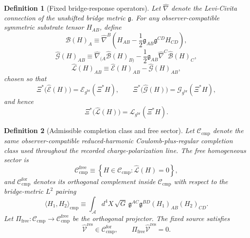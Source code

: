 \documentclass[11pt]{article}
\newcommand{\Sub}{\mathcal A}
\newcommand{\ObserverMap}{\Xi}
\newcommand{\BridgeMetric}{\mathfrak g}
\newcommand{\ObserverMetric}{g^{\mathrm{br}}}
\newcommand{\ResidualLift}{\widehat{\mathcal V}^{\mathrm{res}}}
\newcommand{\SubEinLin}{\widehat{\mathcal E}}
\newcommand{\SubGaugeVec}{\widehat{\mathcal B}}
\newcommand{\SubGaugeBook}{\widehat{\mathcal G}}
\newcommand{\SubReducedEin}{\widehat{\mathcal L}}
\newcommand{\FreeProj}{\Pi_{\mathrm{free}}}
\newcommand{\ReducedEin}{\mathcal L_{\ObserverMetric}}
\newcommand{\GaugeBook}{\mathcal G_{\ObserverMetric}}
\newcommand{\EinLin}{\mathcal E_{\ObserverMetric}}
\newcommand{\CompClass}{\mathscr C_{\mathrm{cmp}}}
\newcommand{\CompFree}{\mathscr C_{\mathrm{cmp}}^{\mathrm{free}}}
\newcommand{\CompForced}{\mathscr C_{\mathrm{cmp}}^{\mathrm{for}}}
\newtheorem{definition}{Definition}
\begin{document}
\begin{definition}[Fixed bridge-response operators]
\label{def:operators}
Let \(\widehat\nabla\) denote the Levi-Civita connection of the unshifted bridge metric \(\BridgeMetric\). For any observer-compatible symmetric substrate tensor \(H_{AB}\), define
\begin{equation}
\SubGaugeVec(H)_A
\equiv
\widehat\nabla^B\!\left(
H_{AB}
-\frac12 \BridgeMetric_{AB}\BridgeMetric^{CD}H_{CD}
\right),
\label{eq:subB}
\end{equation}
\begin{equation}
\SubGaugeBook(H)_{AB}
\equiv
\widehat\nabla_{(A}\SubGaugeVec(H)_{B)}
-\frac12 \BridgeMetric_{AB}\widehat\nabla^C\SubGaugeVec(H)_C,
\label{eq:subG}
\end{equation}
\begin{equation}
\SubReducedEin(H)_{AB}
\equiv
\SubEinLin(H)_{AB}-\SubGaugeBook(H)_{AB},
\label{eq:subL}
\end{equation}
chosen so that
\begin{equation}
\ObserverMap^*\bigl(\SubEinLin(H)\bigr)=\EinLin(\ObserverMap^*H),
\qquad
\ObserverMap^*\bigl(\SubGaugeBook(H)\bigr)=\GaugeBook(\ObserverMap^*H),
\label{eq:intertwine1}
\end{equation}
and hence
\begin{equation}
\ObserverMap^*\bigl(\SubReducedEin(H)\bigr)
=
\ReducedEin(\ObserverMap^*H).
\label{eq:intertwine2}
\end{equation}
\end{definition}

\begin{definition}[Admissible completion class and free sector]
\label{def:class}
Let \(\CompClass\) denote the same observer-compatible reduced-harmonic Coulomb-plus-regular completion class used throughout the recorded charge-polarization line. The free homogeneous sector is
\begin{equation}
\CompFree
\equiv
\left\{
H\in\CompClass:\SubReducedEin(H)=0
\right\},
\label{eq:freeclass}
\end{equation}
and \(\CompForced\) denotes its orthogonal complement inside \(\CompClass\) with respect to the bridge-metric \(L^2\) pairing
\begin{equation}
\langle H_1,H_2\rangle_{\mathrm{cmp}}
\equiv
\int_{\Sub} d^4X\,\sqrt{G}\,
\BridgeMetric^{AC}\BridgeMetric^{BD}(H_1)_{AB}(H_2)_{CD}.
\label{eq:inner}
\end{equation}
Let \(\FreeProj:\CompClass\to\CompFree\) be the orthogonal projector. The fixed source satisfies
\begin{equation}
\ResidualLift\in\CompForced,
\qquad
\FreeProj\ResidualLift=0.
\label{eq:sourcefree}
\end{equation}
\end{definition}
\end{document}
